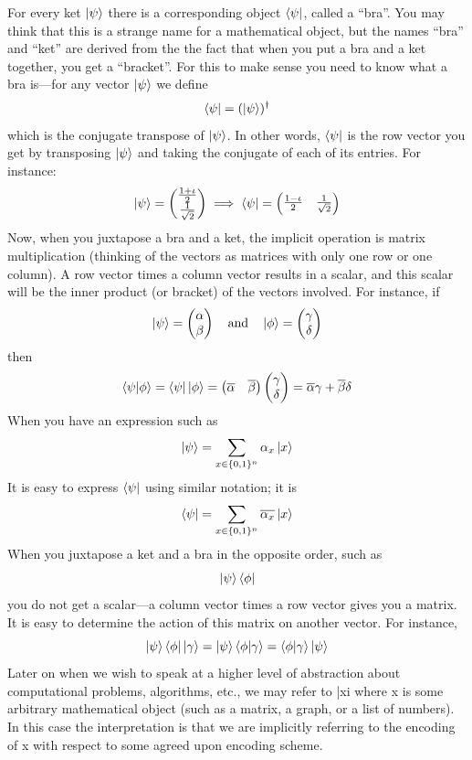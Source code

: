 For every ket $\ket{\psi}$ there is a corresponding object $\bra{\psi}$, called a “bra”. You may think that this is
a strange name for a mathematical object, but the names “bra” and “ket” are derived from the the fact that when you put a bra and a ket together, you get a “bracket”. For this to make sense you
need to know what a bra is—for any vector $\ket{\psi}$ we define
\[
\bra{\psi}=(\ket{\psi})^{\dagger}
\]
which is the conjugate transpose of $\ket{\psi}$. In other words, $\bra{\psi}$ is the row vector you get by transposing
$\ket{\psi}$ and taking the conjugate of each of its entries. For instance:
\[
\ket{\psi}=\begin{pmatrix} \frac{1 + \iota }{2} \\ \frac{1}{\sqrt{2}} \end{pmatrix} \implies \bra{\psi}=\begin{pmatrix} \frac{1-\iota}{2} & \frac{1}{\sqrt{2}} \end{pmatrix}
\]
Now, when you juxtapose a bra and a ket, the implicit operation is matrix multiplication (thinking
of the vectors as matrices with only one row or one column). A row vector times a column vector
results in a scalar, and this scalar will be the inner product (or bracket) of the vectors involved. For
instance, if
\[
\ket{\psi}=\begin{pmatrix} \alpha \\ \beta \end{pmatrix} \quad \text{and}\quad \ket{\phi}=\begin{pmatrix} \gamma \\ \delta \end{pmatrix}
\]
then
\[
\braket{\psi|\phi} = \bra{\psi} \ket{\phi}=\begin{pmatrix} \overline{\alpha} & \overline{\beta} \end{pmatrix} \begin{pmatrix} \gamma \\ \delta \end{pmatrix} =\overline{\alpha}\gamma + \overline{\beta}\delta 
\]
When you have an expression such as
\[
\ket{\psi}=\sum_{x\in\{0,1\}^n} \alpha_x \ket{x}
\]
It is easy to express $\bra{\psi}$ using similar notation; it is
\[
\bra{\psi}=\sum_{x\in\{0,1\}^n} \overline{\alpha_x} \ket{x}
\]
When you juxtapose a ket and a bra in the opposite order, such as
\[
\ket{\psi}\bra{\phi}
\]
you do not get a scalar—a column vector times a row vector gives you a matrix. It is easy to
determine the action of this matrix on another vector. For instance,
\[
\ket{\psi}\bra{\phi}\ket{\gamma}=\ket{\psi}\braket{\phi|\gamma}=\braket{\phi|\gamma}\ket{\psi}
\]
Later on when we wish to speak at a higher level of abstraction about computational problems,
algorithms, etc., we may refer to |xi where x is some arbitrary mathematical object (such as a
matrix, a graph, or a list of numbers). In this case the interpretation is that we are implicitly
referring to the encoding of x with respect to some agreed upon encoding scheme.


